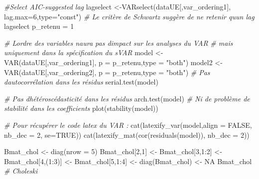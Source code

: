 \documentclass[
  11pt,
]{article}
\newenvironment{Shaded}{\begin{snugshade}}{\end{snugshade}}
\newcommand{\AttributeTok}[1]{\textcolor[rgb]{0.77,0.63,0.00}{#1}}
\newcommand{\CommentTok}[1]{\textcolor[rgb]{0.56,0.35,0.01}{\textit{#1}}}
\newcommand{\ConstantTok}[1]{\textcolor[rgb]{0.00,0.00,0.00}{#1}}
\newcommand{\DecValTok}[1]{\textcolor[rgb]{0.00,0.00,0.81}{#1}}
\newcommand{\FunctionTok}[1]{\textcolor[rgb]{0.00,0.00,0.00}{#1}}
\newcommand{\NormalTok}[1]{#1}
\newcommand{\OtherTok}[1]{\textcolor[rgb]{0.56,0.35,0.01}{#1}}
\newcommand{\SpecialCharTok}[1]{\textcolor[rgb]{0.00,0.00,0.00}{#1}}
\newcommand{\StringTok}[1]{\textcolor[rgb]{0.31,0.60,0.02}{#1}}
\begin{document}
\begin{Shaded}
\begin{Highlighting}[]
\CommentTok{\#Select AIC{-}suggested lag}
\NormalTok{lagselect }\OtherTok{\textless{}{-}}\FunctionTok{VARselect}\NormalTok{(dataUE[,var\_ordering1],}
                      \AttributeTok{lag.max=}\DecValTok{6}\NormalTok{,}\AttributeTok{type=}\StringTok{"const"}\NormalTok{)}
\CommentTok{\# Le critère de Schwartz suggère de ne retenir qu\textquotesingle{}un lag}
\NormalTok{lagselect}
\NormalTok{p\_retenu }\OtherTok{=} \DecValTok{1}

\CommentTok{\# L\textquotesingle{}ordre des variables n\textquotesingle{}aura pas d\textquotesingle{}impact sur les analyses du VAR}
\CommentTok{\# mais uniquement dans la spécification du sVAR}
\NormalTok{model }\OtherTok{\textless{}{-}} \FunctionTok{VAR}\NormalTok{(dataUE[,var\_ordering1],}
           \AttributeTok{p =}\NormalTok{ p\_retenu,}\AttributeTok{type =} \StringTok{"both"}\NormalTok{)}
\NormalTok{model2 }\OtherTok{\textless{}{-}} \FunctionTok{VAR}\NormalTok{(dataUE[,var\_ordering2],}
             \AttributeTok{p =}\NormalTok{ p\_retenu,}\AttributeTok{type =} \StringTok{"both"}\NormalTok{)}
\CommentTok{\# Pas d\textquotesingle{}autocorrélation dans les résidus}
\FunctionTok{serial.test}\NormalTok{(model)}

\CommentTok{\# Pas d\textquotesingle{}hétéroscédasticité dans les résidus}
\FunctionTok{arch.test}\NormalTok{(model)}
\CommentTok{\# Ni de problème de stabilité dans les coefficients}
\FunctionTok{plot}\NormalTok{(}\FunctionTok{stability}\NormalTok{(model))}

\CommentTok{\# Pour récupérer le code latex du VAR :}
\FunctionTok{cat}\NormalTok{(}\FunctionTok{latexify\_var}\NormalTok{(model,}\AttributeTok{align =} \ConstantTok{FALSE}\NormalTok{, }\AttributeTok{nb\_dec =} \DecValTok{2}\NormalTok{, }\AttributeTok{se=}\ConstantTok{TRUE}\NormalTok{))}
\FunctionTok{cat}\NormalTok{(}\FunctionTok{latexify\_mat}\NormalTok{(}\FunctionTok{cor}\NormalTok{(}\FunctionTok{residuals}\NormalTok{(model)), }\AttributeTok{nb\_dec =} \DecValTok{2}\NormalTok{))}

\NormalTok{Bmat\_chol }\OtherTok{\textless{}{-}} \FunctionTok{diag}\NormalTok{(}\AttributeTok{nrow =} \DecValTok{5}\NormalTok{)}
\NormalTok{Bmat\_chol[}\DecValTok{2}\NormalTok{,}\DecValTok{1}\NormalTok{] }\OtherTok{\textless{}{-}}\NormalTok{ Bmat\_chol[}\DecValTok{3}\NormalTok{,}\DecValTok{1}\SpecialCharTok{:}\DecValTok{2}\NormalTok{] }\OtherTok{\textless{}{-}} 
\NormalTok{    Bmat\_chol[}\DecValTok{4}\NormalTok{,(}\DecValTok{1}\SpecialCharTok{:}\DecValTok{3}\NormalTok{)] }\OtherTok{\textless{}{-}}\NormalTok{ Bmat\_chol[}\DecValTok{5}\NormalTok{,}\DecValTok{1}\SpecialCharTok{:}\DecValTok{4}\NormalTok{] }\OtherTok{\textless{}{-}} 
    \FunctionTok{diag}\NormalTok{(Bmat\_chol) }\OtherTok{\textless{}{-}} \ConstantTok{NA}
\NormalTok{Bmat\_chol }\CommentTok{\# Choleski}


\end{Highlighting}
\end{Shaded}
\end{document}
